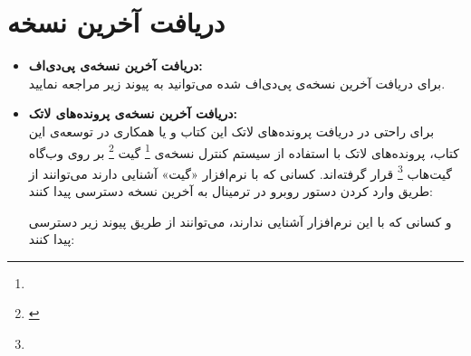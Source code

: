 \chapter*{دریافت آخرین نسخه}
\begin{itemize}
\item \textbf{دریافت آخرین نسخه‌ی پی‌دی‌اف:} \\
 برای دریافت آخرین نسخه‌ی پی‌دی‌اف شده می‌توانید به پیوند زیر مراجعه نمایید.
\begin{url-address}

\end{url-address}
\item \textbf{دریافت آخرین نسخه‌ی پرونده‌های لاتک:} \\
برای راحتی در دریافت پرونده‌های لاتک این کتاب و یا همکاری در توسعه‌ی این کتاب، پرونده‌های لاتک با استفاده از سیستم کنترل نسخه‌ی
\footnote{}
گیت
\footnote{‌}
بر روی وب‌گاه گیت‌هاب
\footnote{}
قرار گرفته‌اند. کسانی که با نرم‌افزار «گیت» آشنایی دارند می‌توانند از طریق وارد کردن دستور روبرو در ترمینال به آخرین نسخه دسترسی پیدا کنند:
\begin{latin}

\end{latin}
و کسانی که با این نرم‌افزار آشنایی ندارند، می‌توانند از طریق پیوند زیر دسترسی پیدا کنند:
\begin{url-address}

\end{url-address}
 
\end{itemize}